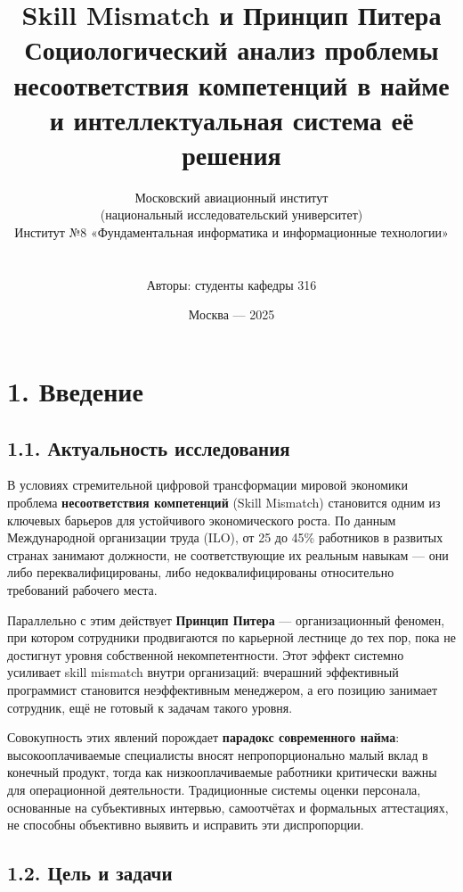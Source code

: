 \documentclass[
  russian,
]{report}
\title{Skill Mismatch и Принцип Питера\\
Социологический анализ проблемы несоответствия компетенций в найме и
интеллектуальная система её решения}
\author{Московский авиационный институт\\
(национальный исследовательский университет)\\
Институт №8 «Фундаментальная информатика и информационные технологии»\\
\strut \\
Авторы: студенты кафедры 316}
\date{Москва --- 2025}
\begin{document}
\maketitle

{
\setcounter{tocdepth}{2}
\tableofcontents
}
\chapter{1. Введение}\label{ux432ux432ux435ux434ux435ux43dux438ux435}

\section{1.1. Актуальность
исследования}\label{ux430ux43aux442ux443ux430ux43bux44cux43dux43eux441ux442ux44c-ux438ux441ux441ux43bux435ux434ux43eux432ux430ux43dux438ux44f}

В условиях стремительной цифровой трансформации мировой экономики
проблема \textbf{несоответствия компетенций} (Skill Mismatch) становится
одним из ключевых барьеров для устойчивого экономического роста. По
данным Международной организации труда (ILO), от 25 до 45\% работников в
развитых странах занимают должности, не соответствующие их реальным
навыкам --- они либо переквалифицированы, либо недоквалифицированы
относительно требований рабочего места.

Параллельно с этим действует \textbf{Принцип Питера} --- организационный
феномен, при котором сотрудники продвигаются по карьерной лестнице до
тех пор, пока не достигнут уровня собственной некомпетентности. Этот
эффект системно усиливает skill mismatch внутри организаций: вчерашний
эффективный программист становится неэффективным менеджером, а его
позицию занимает сотрудник, ещё не готовый к задачам такого уровня.

Совокупность этих явлений порождает \textbf{парадокс современного
найма}: высокооплачиваемые специалисты вносят непропорционально малый
вклад в конечный продукт, тогда как низкооплачиваемые работники
критически важны для операционной деятельности. Традиционные системы
оценки персонала, основанные на субъективных интервью, самоотчётах и
формальных аттестациях, не способны объективно выявить и исправить эти
диспропорции.

\section{1.2. Цель и
задачи}\label{ux446ux435ux43bux44c-ux438-ux437ux430ux434ux430ux447ux438}
\end{document}
